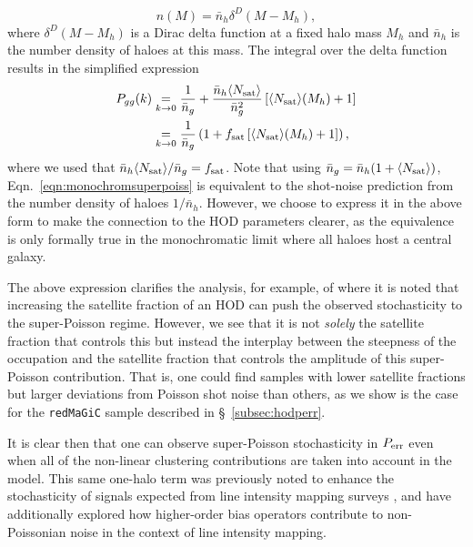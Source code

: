 \documentclass[fleqn,usenatbib]{mnras}
\newcommand{\redmagic}{\texttt{redMaGiC} }
\begin{document}
\begin{equation}
    n(M) = \bar{n}_h \delta^D (M - M_h),
\end{equation}
where $\delta^D(M - M_h)$ is a Dirac delta function at a fixed halo mass $M_h$ and $\bar{n}_h$ is the number density of haloes at this mass. The integral over the delta function results in the simplified expression
\begin{align}
    P_{gg} (k) & \underset{k \to 0}{=} \frac{1}{\bar{n}_g} + \frac{\bar{n}_h \langle N_{\rm sat} \rangle}{\bar{n}_g^2} \left [ \langle N_{\rm sat} \rangle (M_h) + 1 \right ] \nonumber \\
    \label{eqn:monochromsuperpoiss} &\underset{k \to 0}{=} \frac{1}{\bar{n}_g} \left ( 1 +  f_{\rm sat} \left [ \langle N_{\rm sat} \rangle (M_h) + 1 \right ] \right), 
\end{align}
where we used that $\bar{n}_h \langle N_{\rm sat} \rangle / \bar{n}_g = f_{\rm sat}$. Note that using $\bar{n}_g=\bar{n}_h(1+\langle N_{\rm sat} \rangle)$, Eqn.~\ref{eqn:monochromsuperpoiss} is equivalent to the shot-noise prediction from the number density of haloes $1/\bar{n}_h$. However, we choose to express it in the above form to make the connection to the HOD parameters clearer, as the equivalence is only formally true in the monochromatic limit where all haloes host a central galaxy. \par 
The above expression clarifies the analysis, for example, of \citet{Baldauf_2013} where it is noted that increasing the satellite fraction of an HOD can push the observed stochasticity to the super-Poisson regime. However, we see that it is not \emph{solely} the satellite fraction that controls this but instead the interplay between the steepness of the occupation and the satellite fraction that controls the amplitude of this super-Poisson contribution. That is, one could find samples with lower satellite fractions but larger deviations from Poisson shot noise than others, as we show is the case for the \redmagic sample described in \S~\ref{subsec:hodperr}.\par 
It is clear then that one can observe super-Poisson stochasticity in $P_{\rm err}$ even when all of the non-linear clustering contributions are taken into account in the model. This same one-halo term was previously noted to enhance the stochasticity of signals expected from line intensity mapping surveys \citep{Schaan_2021,dizgah2021precision}, and \cite{dizgah2021precision} have additionally explored how higher-order bias operators contribute to non-Poissonian noise in the context of line intensity mapping. \par
\end{document}
